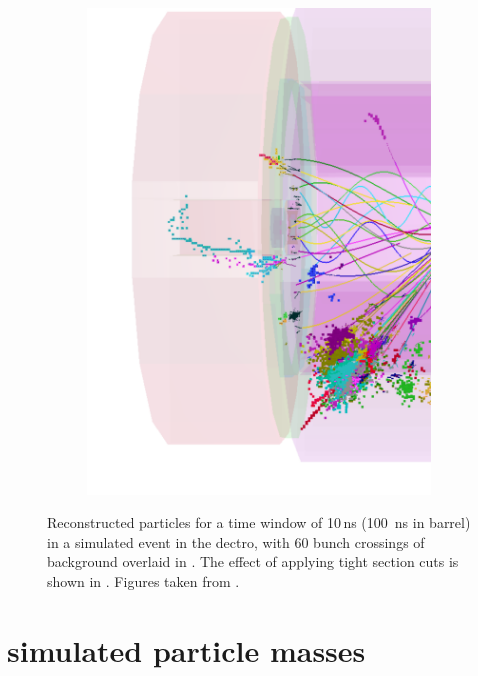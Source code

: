 \begin{figure}[tdbph]
\begin{subfigure}[b]{0.45\textwidth}
    \includegraphics[width=\textwidth]{pandora/evtDisplayggHad2}
    \caption{}
    \label{fig:pandoraEvtDisplayggHad2}
  \end{subfigure}
\caption[Effect of the suppression of the background with the tight \PFO selection.]
{Reconstructed particles for a time window of 10\,ns (100 \,ns in \HCAL barrel) in a simulated \HepProcess{\Pep\Pem \to \PHiggs\PHiggs \to \Ptop\APbottom\Pbottom\APtop} event in the \CLICILD dectro, with 60 bunch crossings of \ggHad background overlaid in . The effect of applying tight \PFO section cuts is shown in .  Figures taken from \cite{Marshall:2012ry}.}
\label{fig:pandoraEvtDisplayggHad}
\end{figure}


\section{\CLIC simulated particle masses}


